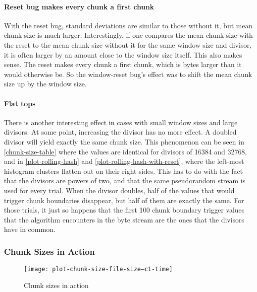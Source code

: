 \paragraph{Reset bug makes every chunk a first chunk}

With the reset bug, standard deviations are similar to those without it, but
mean chunk size is much larger. Interestingly, if one compares the mean chunk
size with the reset to the mean chunk size without it for the same window size
and divisor, it is often larger by an amount close to the window size itself.
This also makes sense. The reset makes every chunk a first chunk, which is
 bytes larger than it would otherwise be. So the
window-reset bug's effect was to shift the mean chunk size up by the window
size.

\paragraph{Flat tops}

There is another interesting effect in cases with small window sizes and large
divisors. At some point, increasing the divisor has no more effect. A doubled
divisor will yield exactly the same chunk size. This phenomenon can be seen in
\autoref{chunk-size-table} where the values are identical for divisors of
\num{16384} and \num{32768}, and in \autoref{plot-rolling-hash} and
\autoref{plot-rolling-hash-with-reset}, where the left-most histogram clusters
flatten out on their right sides. This has to do with the fact that the divisors
are powers of two, and that the same pseudorandom stream is used for every
trial. When the divisor doubles, half of the values that would trigger chunk
boundaries disappear, but half of them are exactly the same. For those trials,
it just so happens that the first \num{100} chunk boundary trigger values that
the algorithm encounters in the byte stream are the ones that the divisors have
in common.

%


\subsubsection{Chunk Sizes in Action}

\begin{figure}[p]
    \caption{Chunk sizes in action}
    \label{plot-chunk-size-file-size--c1-time}
    \centering

    \explainlogsubfig

    \texttt{[image: plot-chunk-size-file-size--c1-time]}
\end{figure}

